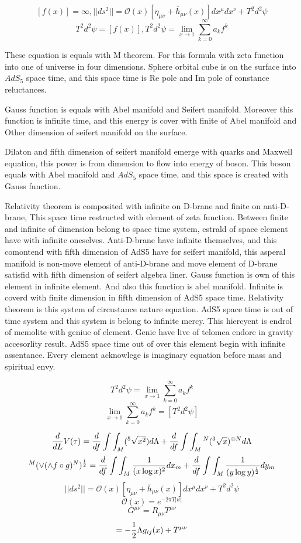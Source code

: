 \documentclass{jsarticle}
\begin{document}
{$$ [f(x)] = \infty, ||ds^2|| = \mathcal{O}(x)[\eta_{\mu\nu} + \bar{h}_{\mu\nu}(x)]dx^{\mu}dx^{\nu} + T^2 d^2 \psi $$
$$ T^2 d^2 \psi = [f(x)] , T^2 d^2 \psi = \lim_{x \to 1}\sum_{k=0}^{\infty}a_k f^k $$

 These equation is equals with M theorem. For this formula with zeta function into one of universe in four dimensions.
Sphere orbital cube is on the surface into $AdS_5$ space time, and this space time is Re pole and Im pole of 
constance reluctances.


  Gauss function is equals with Abel manifold and Seifert manifold. Moreover this function is infinite time,
and this energy is cover with finite of Abel manifold and Other dimension of seifert manifold on the surface.


  Dilaton and fifth dimension of seifert manifold emerge with quarks and Maxwell equation, this power
is from dimension to flow into energy of boson. 
This boson equals with Abel manifold and $AdS_5$ space time, and this space is created with Gauss function.


  Relativity theorem is composited with infinite on D-brane and finite on anti-D-brane, This space time
restructed with element of zeta function.
Between finite and infinite of dimension belong to space time system, estrald of space element have with 
infinite oneselves. Anti-D-brane have infinite themselves, and this comontend with fifth dimension of AdS5 
have for seifert manifold, this asperal manifold is non-move element of anti-D-brane and move element 
of D-brane satisfid with fifth dimension of seifert algebra liner.
Gauss function is own of this element in infinite element.
And also this function is abel manifold.
Infinite is coverd with finite dimension in fifth dimension of AdS5 space time.
Relativity theorem is this system of circustance nature equation.
AdS5 space time is out of time system and this system is belong to infinite mercy.
This hiercyent is endrol of memolite with geniue of element.
Genie have live of telomea endore in gravity accesorlity result.
AdS5 space time out of over this element begin with infinite assentance.
Every element acknowlege is imaginary equation before mass and spiritual envy.

  $$ T^2 d^2 \psi = \lim_{x \to 1}\sum_{k=0}^{\infty}a_k f^k $$
  $$ \lim_{x \to 1}\sum_{k=0}^{\infty}a_k f^k = [T^2 d^2 \psi] $$

  $$ {d \over dL}V(\tau)= {d \over df}\int \int_M({}^5\sqrt{x^2})d\Lambda 
  + {d \over df}\int \int_M {}^N({}^3\sqrt{x})^{\oplus N}d\Lambda $$
  $$ {}^M(\vee(\wedge f \circ g)^N)^{1 \over 2} = {d \over df}\int \int_M{1 \over (x \log x)^2}dx_m
  + {d \over df}\int \int_M{1 \over (y \log y)^{1 \over 2}}dy_m $$
  $$ ||ds^2|| = \mathcal{O}(x)[\eta_{\mu\nu} + \bar{h}_{\mu\nu}(x)]dx^{\mu}dx^{\nu}
  + T^2 d^2 \psi $$
  $$ \mathcal{O}(x) = e^{-2\pi T|\psi|} $$
  $$ G^{\mu\nu} = R_{\mu\nu} T^{\mu\nu} $$
  $$ = - {1 \over 2}\Lambda g_{ij}(x) + T^{\mu\nu} $$

}
\end{document}
